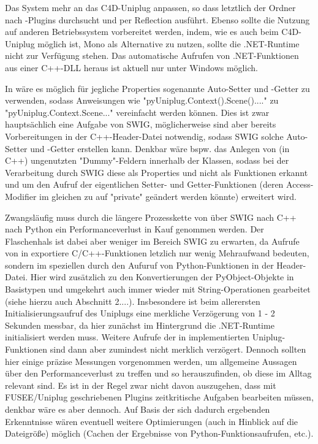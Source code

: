 Das System mehr an das C4D-Uniplug anpassen, so dass letztlich der Ordner nach \CS{}-Plugins durchsucht und per Reflection ausführt. Ebenso sollte die Nutzung auf anderen Betriebssystem vorbereitet werden, indem, wie es auch beim C4D-Uniplug möglich ist, Mono als Alternative zu nutzen, sollte die .NET-Runtime nicht zur Verfügung stehen. Das automatische Aufrufen von .NET-Funktionen aus einer C++-DLL heraus ist aktuell nur unter Windows möglich.

In \CS{} wäre es möglich für jegliche Properties sogenannte Auto-Setter und -Getter zu verwenden, sodass Anweisungen wie "pyUniplug.Context().Scene()...." zu "pyUniplug.Context.Scene..." vereinfacht werden können. Dies ist zwar hauptsächlich eine Aufgabe von SWIG, möglicherweise sind aber bereits Vorbereitungen in der C++-Header-Datei notwendig, sodass SWIG solche Auto-Setter und -Getter erstellen kann. Denkbar wäre bspw. das Anlegen von (in C++) ungenutzten "Dummy"-Feldern innerhalb der Klassen, sodass bei der Verarbeitung durch SWIG diese als Properties und nicht als Funktionen erkannt und um den Aufruf der eigentlichen Setter- und Getter-Funktionen (deren Access-Modifier im gleichen zu auf "private" geändert werden könnte) erweitert wird.

Zwangsläufig muss durch die längere Prozesskette von \CS{} über SWIG nach C++ nach Python ein Performanceverlust in Kauf genommen werden. Der Flaschenhals ist dabei aber weniger im Bereich SWIG zu erwarten, da Aufrufe von \CS{} in exportiere C/C++-Funktionen letzlich nur wenig Mehraufwand bedeuten, sondern im speziellen durch den Aufuruf von Python-Funktionen in der Header-Datei. Hier wird zusätzlich zu den Konvertierungen der PyObject-Objekte in Basistypen und umgekehrt auch immer wieder mit String-Operationen gearbeitet (siehe hierzu auch Abschnitt 2....). Insbesondere ist beim allerersten Initialisierungsaufruf des Uniplugs eine merkliche Verzögerung von 1 - 2 Sekunden messbar, da hier zunächst im Hintergrund die .NET-Runtime initialisiert werden muss. Weitere Aufrufe der in \CS{} implementierten Uniplug-Funktionen sind dann aber zumindest nicht merklich verzögert. Dennoch sollten hier einige präzise Messungen vorgenommen werden, um allgemeine Aussagen über den Performanceverlust zu treffen und so herauszufinden, ob diese im Alltag relevant sind. Es ist in der Regel zwar nicht davon auszugehen, dass mit FUSEE/Uniplug geschriebenen Plugins zeitkritische Aufgaben bearbeiten müssen, denkbar wäre es aber dennoch.  Auf Basis der sich dadurch ergebenden Erkenntnisse wären eventuell weitere Optimierungen (auch in Hinblick auf die Dateigröße) möglich (Cachen der Ergebnisse von Python-Funktionsaufrufen, etc.).